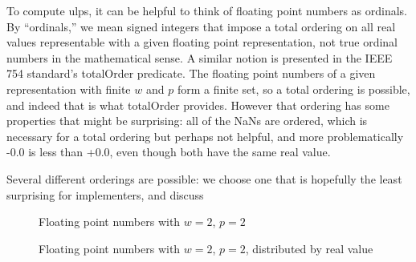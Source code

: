 \documentclass[letterpaper,10pt]{article}
\begin{document}
To compute ulps, it can be helpful to think of floating point numbers as ordinals. By ``ordinals,'' we mean signed integers that impose a total ordering on all real values representable with a given floating point representation, not true ordinal numbers in the mathematical sense. A similar notion is presented in the IEEE 754 standard's totalOrder predicate. The floating point numbers of a given representation with finite $w$ and $p$ form a finite set, so a total ordering is possible, and indeed that is what totalOrder provides. However that ordering has some properties that might be surprising: all of the NaNs are ordered, which is necessary for a total ordering but perhaps not helpful, and more problematically -0.0 is less than +0.0, even though both have the same real value.

Several different orderings are possible: we choose one that is hopefully the least surprising for implementers, and discuss

\begin{figure}[h!]
 \centering
 \caption{Floating point numbers with $w=2$, $p=2$} \label{fig:numberline1}
 \smallskip
\end{figure}

\begin{figure}[h!]
 \centering
 \caption{Floating point numbers with $w=2$, $p=2$, distributed by real value} \label{fig:numberline2}
 \smallskip
 \centering
\end{figure}



\end{document}
